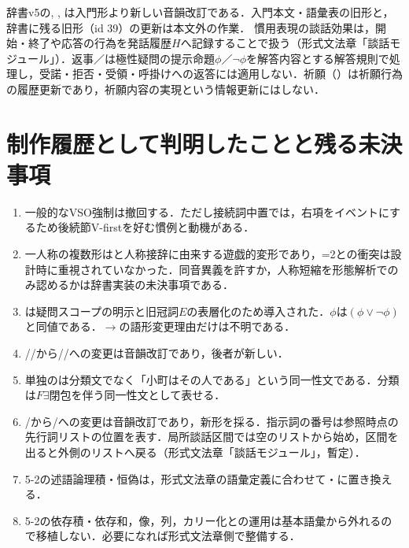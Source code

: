\documentclass[../../main-detail.tex]{subfiles}
\begin{document}
辞書v5の, , は入門形より新しい音韻改訂である．入門本文・語彙表の旧形と，辞書に残る旧形（id 39）の更新は本文外の作業．
慣用表現の談話効果は，開始・終了や応答の行為を発話履歴$H$へ記録することで扱う（形式文法章「談話モジュール」）．返事／は極性疑問の提示命題$\phi$／$\lnot\phi$を解答内容とする解答規則で処理し，受諾・拒否・受領・呼掛けへの返答には適用しない．祈願（）は祈願行為の履歴更新であり，祈願内容の実現という情報更新にはしない．

\section{制作履歴として判明したことと残る未決事項}
\begin{enumerate}
    \item 一般的なVSO強制は撤回する．ただし接続詞中置では，右項をイベントにするため後続節V-firstを好む慣例と動機がある．
    \item 一人称の複数形はと人称接辞に由来する遊戯的変形であり，=2との衝突は設計時に重視されていなかった．同音異義を許すか，人称短縮を形態解析でのみ認めるかは辞書実装の未決事項である．
    \item {}は疑問スコープの明示と旧冠詞$E$の表層化のため導入された．\;$\phi$\;は\;$(\phi\lor\lnot\phi)$\;と同値である．$\to$の語形変更理由だけは不明である．
    \item {}//から//への変更は音韻改訂であり，後者が新しい．
    \item 単独のは分類文でなく「小町はその人である」という同一性文である．分類は$F\exists$閉包を伴う同一性文として表せる．
    \item {}/から/への変更は音韻改訂であり，新形を採る．指示詞の番号は参照時点の先行詞リストの位置を表す．局所談話区間では空のリストから始め，区間を出ると外側のリストへ戻る（形式文法章「談話モジュール」，暫定）．
    \item 5-2の述語論理積・恒偽は，形式文法章の語彙定義に合わせて・に置き換える．
    \item 5-2の依存積・依存和，像，列，カリー化との運用は基本語彙から外れるので移植しない．必要になれば形式文法章側で整備する．
\end{enumerate}
\end{document}
